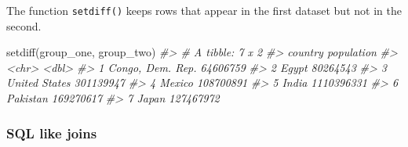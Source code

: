 \documentclass[
]{book}
\newenvironment{Shaded}{\begin{snugshade}}{\end{snugshade}}
\newcommand{\CommentTok}[1]{\textcolor[rgb]{0.56,0.35,0.01}{\textit{#1}}}
\newcommand{\FunctionTok}[1]{\textcolor[rgb]{0.00,0.00,0.00}{#1}}
\newcommand{\NormalTok}[1]{#1}
\begin{document}
The function \texttt{setdiff()} keeps rows that appear in the first dataset but not in the second.

\begin{Shaded}
\begin{Highlighting}[]
\FunctionTok{setdiff}\NormalTok{(group\_one, group\_two)}
\CommentTok{\#\textgreater{} \# A tibble: 7 x 2}
\CommentTok{\#\textgreater{}   country          population}
\CommentTok{\#\textgreater{}   \textless{}chr\textgreater{}                 \textless{}dbl\textgreater{}}
\CommentTok{\#\textgreater{} 1 Congo, Dem. Rep.   64606759}
\CommentTok{\#\textgreater{} 2 Egypt              80264543}
\CommentTok{\#\textgreater{} 3 United States     301139947}
\CommentTok{\#\textgreater{} 4 Mexico            108700891}
\CommentTok{\#\textgreater{} 5 India            1110396331}
\CommentTok{\#\textgreater{} 6 Pakistan          169270617}
\CommentTok{\#\textgreater{} 7 Japan             127467972}
\end{Highlighting}
\end{Shaded}

\hypertarget{sql-like-joins}{%
\subsubsection{SQL like joins}\label{sql-like-joins}}
\end{document}
